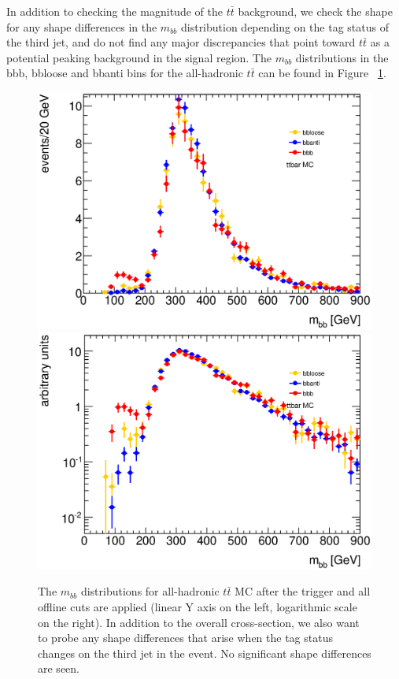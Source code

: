 In addition to checking the magnitude of the $t\bar{t}$ background, we check the shape
for any shape differences in the $m_{bb}$ distribution depending on the tag status of the
third jet, and do not find any major discrepancies that point toward $t\bar{t}$ as a
potential peaking background in the signal region. The $m_{bb}$ distributions in the
bbb, bbloose and bbanti bins for the all-hadronic $t\bar{t}$ can be found in Figure
~\ref{fig:ttbar_mbb}.




\begin{figure}[hbt]
\includegraphics[width=0.45\linewidth]{BackgroundEstimation/images/mbb_compare_bbb_bbloose_bbanti_ttbar.eps}
\includegraphics[width=0.45\linewidth]{BackgroundEstimation/images/mbb_compare_bbb_bbloose_bbanti_ttbar_logy.eps}
\caption{The $m_{bb}$ distributions for all-hadronic $t\bar{t}$ MC after the trigger and all offline cuts are applied (linear Y axis on the left, logarithmic scale on the right).  In addition to the overall cross-section, we also want to probe any shape differences that arise when the tag status changes on the third jet in the event.  No significant shape differences are seen.}
\label{fig:ttbar_mbb}
\end{figure}

















